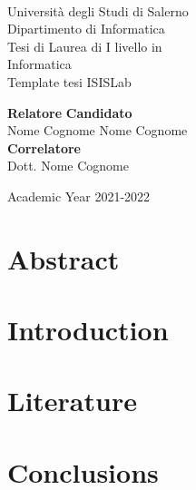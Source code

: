\documentclass[11pt,oneside]{book}
\begin{document}
\begin{titlepage}
\begin{center}
\\[0.2truecm]
{\Large Universit\`a degli Studi di Salerno}\\[0.2truecm]
{\large Dipartimento di Informatica}\\
\hrulefill
\vfill
{\large Tesi di Laurea di I livello in }\\[0.2truecm]
{\Large Informatica}\\
\vfill\vfill
{\Huge Template tesi ISISLab}
\vfill\vfill


{\bf Relatore} \hfill {\bf Candidato}\ \ \\
Nome Cognome \hfill Nome Cognome\\
{\bf Correlatore} \hfill {\bf }\ \ \\
Dott. Nome Cognome \hfill \ \ \\

\vfill
\hrulefill 

Academic Year 2021-2022

\end{center}
\end{titlepage}

\chapter*{Abstract}




\tableofcontents
\pagestyle{plain}

\chapter{Introduction}
\setcounter{page}{1} 	%

 
\chapter{Literature}


\chapter{Conclusions}


\nocite{*}
\printbibliography[title={Bibliography}] 

\end{document}
